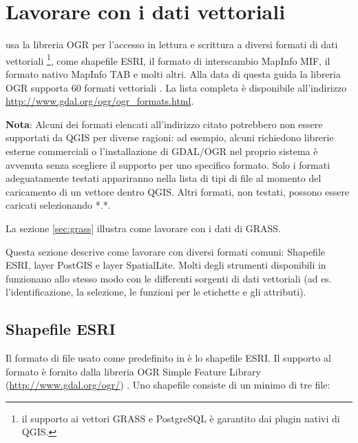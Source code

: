 
\chapter{Lavorare con i dati vettoriali}\label{label_workingvector}


\qg usa la libreria OGR per l'accesso in lettura e scrittura a diversi 
formati di dati vettoriali \footnote{il supporto ai vettori GRASS e PostgreSQL
è garantito dai plugin nativi di QGIS.}, come shapefile ESRI,
 il formato di interscambio MapInfo MIF, 
 il formato nativo MapInfo TAB 
 e molti altri.
Alla data di questa guida la libreria OGR supporta 60 formati vettoriali \cite{OGRweb}. 
La lista completa è disponibile all'indirizzo
\url{http://www.gdal.org/ogr/ogr_formats.html}.

\textbf{Nota}: Alcuni dei formati elencati all'indirizzo citato potrebbero
non essere supportati da QGIS per diverse ragioni: ad esempio, alcuni richiedono
librerie esterne commerciali o l'installazione di GDAL/OGR nel proprio sistema
è avvenuta senza scegliere il supporto per uno specifico formato. 
Solo i formati adeguatamente testati appariranno nella lista di tipi di file
al momento del caricamento di un vettore dentro QGIS. 
Altri formati, non testati, possono essere caricati selezionando *.*.

La sezione \ref{sec:grass} illustra come lavorare con i dati di GRASS.

Questa sezione descrive come lavorare con diversi formati comuni:
Shapefile ESRI, layer PostGIS e layer SpatialLite. Molti degli strumenti 
disponibili in \qg funzionano allo stesso modo con le differenti sorgenti 
di dati vettoriali (ad es. l'identificazione, la selezione, le funzioni per 
le etichette e gli attributi).

\section{Shapefile ESRI}

Il formato di file usato come predefinito in \qg è lo shapefile ESRI. 
Il supporto al formato è fornito dalla libreria OGR Simple Feature Library (\url{http://www.gdal.org/ogr/})
. Uno shapefile consiste di un minimo di tre file:

